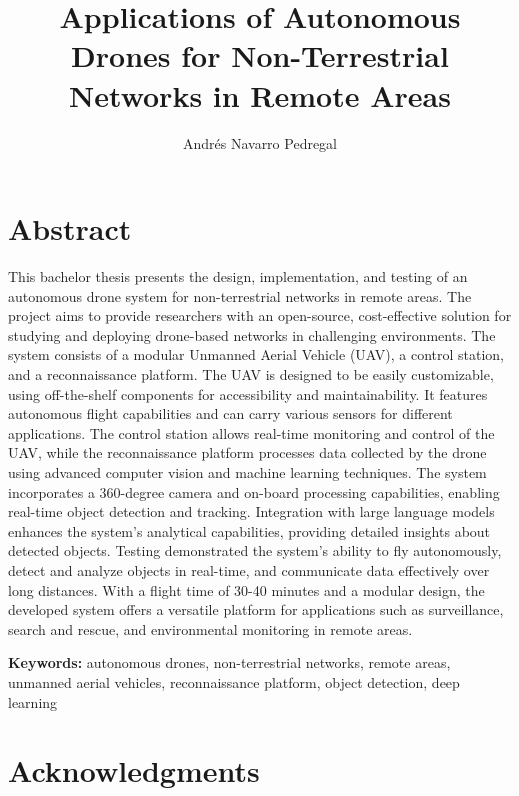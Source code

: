 \documentclass[oneside, 12pt, a4paper]{book}
\title{Applications of Autonomous Drones for Non-Terrestrial Networks in Remote Areas}
\author{Andrés Navarro Pedregal}
\begin{document}

\frontmatter
\maketitle

\blankpage%
\chapter*{Abstract}

This bachelor thesis presents the design, implementation, and testing of an autonomous drone system for non-terrestrial networks in remote areas. The project aims to provide researchers with an open-source, cost-effective solution for studying and deploying drone-based networks in challenging environments. The system consists of a modular Unmanned Aerial Vehicle (UAV), a control station, and a reconnaissance platform. The UAV is designed to be easily customizable, using off-the-shelf components for accessibility and maintainability. It features autonomous flight capabilities and can carry various sensors for different applications. The control station allows real-time monitoring and control of the UAV, while the reconnaissance platform processes data collected by the drone using advanced computer vision and machine learning techniques. The system incorporates a 360-degree camera and on-board processing capabilities, enabling real-time object detection and tracking. Integration with large language models enhances the system's analytical capabilities, providing detailed insights about detected objects. Testing demonstrated the system's ability to fly autonomously, detect and analyze objects in real-time, and communicate data effectively over long distances. With a flight time of 30-40 minutes and a modular design, the developed system offers a versatile platform for applications such as surveillance, search and rescue, and environmental monitoring in remote areas.

\textbf{Keywords:} autonomous drones, non-terrestrial networks, remote areas, unmanned aerial vehicles, reconnaissance platform, object detection, deep learning

\blankpage%

\chapter*{Acknowledgments}
\begingroup
\let\clearpage\relax %
\end{document}
